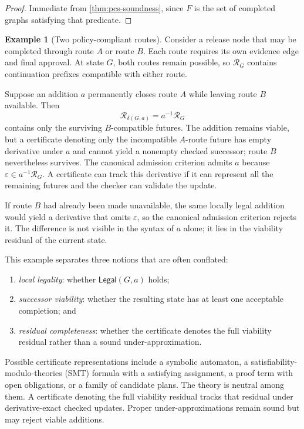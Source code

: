 \documentclass[11pt]{article}
\theoremstyle{definition}
\newtheorem{example}[example]{Example}
\newcommand{\Accept}{F}
\newcommand{\Residual}{\mathcal R}
\newcommand{\Legal}{\mathsf{Legal}}
\newcommand{\eps}{\varepsilon}
\begin{document}
\begin{proof}
Immediate from \cref{thm:pcs-soundness}, since $\Accept$ is the set of completed graphs satisfying that predicate.
\end{proof}

\begin{example}[Two policy-compliant routes]\label{ex:routes}
Consider a release node that may be completed through route $A$ or route $B$. Each route requires its own evidence edge and final approval. At state $G$, both routes remain possible, so $\Residual_G$ contains continuation prefixes compatible with either route.

Suppose an addition $a$ permanently closes route $A$ while leaving route $B$ available. Then
\[
  \Residual_{\delta(G,a)}=a^{-1}\Residual_G
\]
contains only the surviving $B$-compatible futures. The addition remains viable, but a certificate denoting only the incompatible $A$-route future has empty derivative under $a$ and cannot yield a nonempty checked successor; route $B$ nevertheless survives. The canonical admission criterion admits $a$ because $\eps\in a^{-1}\Residual_G$. A certificate can track this derivative if it can represent all the remaining futures and the checker can validate the update.

If route $B$ had already been made unavailable, the same locally legal addition would yield a derivative that omits $\eps$, so the canonical admission criterion rejects it. The difference is not visible in the syntax of $a$ alone; it lies in the viability residual of the current state.
\end{example}

This example separates three notions that are often conflated:
\begin{enumerate}[label=(\alph*)]
  \item \emph{local legality}: whether $\Legal(G,a)$ holds;
  \item \emph{successor viability}: whether the resulting state has at least one acceptable completion; and
  \item \emph{residual completeness}: whether the certificate denotes the full viability residual rather than a sound under-approximation.
\end{enumerate}

Possible certificate representations include a symbolic automaton, a satisfiability-modulo-theories (SMT) formula with a satisfying assignment, a proof term with open obligations, or a family of candidate plans. The theory is neutral among them. A certificate denoting the full viability residual tracks that residual under derivative-exact checked updates. Proper under-approximations remain sound but may reject viable additions.
\end{document}
